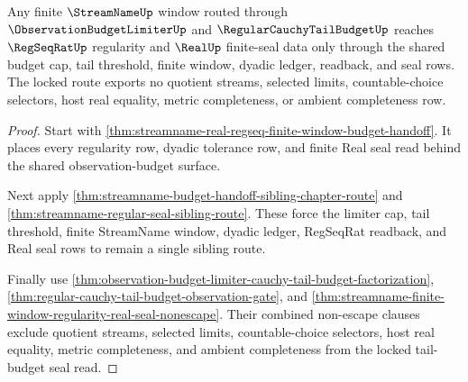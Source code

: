 \begin{theorem}
\label{thm:streamname-budget-tail-regular-seal-lock}
Any finite $\StreamNameUp$ window routed through
$\ObservationBudgetLimiterUp$ and $\RegularCauchyTailBudgetUp$ reaches
$\RegSeqRatUp$ regularity and $\RealUp$ finite-seal data only through the
shared budget cap, tail threshold, finite window, dyadic ledger, readback, and
seal rows. The locked route exports no quotient streams, selected limits,
countable-choice selectors, host real equality, metric completeness, or
ambient completeness row.
\end{theorem}
\begin{proof}
Start with \autoref{thm:streamname-real-regseq-finite-window-budget-handoff}.
It places every regularity row, dyadic tolerance row, and finite Real seal read
behind the shared observation-budget surface.

Next apply \autoref{thm:streamname-budget-handoff-sibling-chapter-route} and
\autoref{thm:streamname-regular-seal-sibling-route}. These force the limiter
cap, tail threshold, finite StreamName window, dyadic ledger, RegSeqRat
readback, and Real seal rows to remain a single sibling route.

Finally use
\autoref{thm:observation-budget-limiter-cauchy-tail-budget-factorization},
\autoref{thm:regular-cauchy-tail-budget-observation-gate}, and
\autoref{thm:streamname-finite-window-regularity-real-seal-nonescape}. Their
combined non-escape clauses exclude quotient streams, selected limits,
countable-choice selectors, host real equality, metric completeness, and
ambient completeness from the locked tail-budget seal read.
\end{proof}


